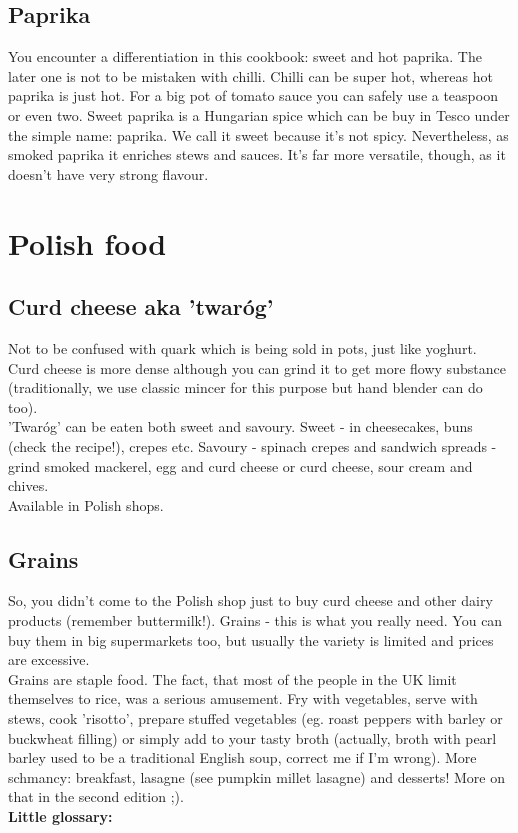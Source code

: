 \documentclass[12pt,a4paper]{article}
\begin{document}
		\subsection* {Paprika}
	You encounter a differentiation in this cookbook: sweet and hot paprika. The later one is not to be mistaken with chilli. Chilli can be super hot, whereas hot paprika is just hot. For a big pot of tomato sauce you can safely use a teaspoon or even two. Sweet paprika is a Hungarian spice which can be buy in Tesco under the simple name: paprika. We call it sweet because it's not spicy. Nevertheless, as smoked paprika it enriches stews and sauces. It's far more versatile, though, as it doesn't have very strong flavour.
	
	\section*{Polish food}
	
	\subsection*{Curd cheese aka 'twaróg'}
	
	Not to be confused with quark which is being sold in pots, just like yoghurt.\\
	Curd cheese is more dense although you can grind it to get more flowy substance (traditionally, we use classic mincer for this purpose but hand blender can do too).\\
	'Twaróg' can be eaten both sweet and savoury. Sweet - in cheesecakes, buns (check the recipe!), crepes etc. Savoury - spinach crepes and sandwich spreads - grind smoked mackerel, egg and curd cheese or curd cheese, sour cream and chives.\\
	Available in Polish shops.
	
	\subsection*{Grains}
	So, you didn't come to the Polish shop just to buy curd cheese and other dairy products (remember buttermilk!). Grains - this is what you really need. You can buy them in big supermarkets too, but usually the variety is limited and prices are excessive.\\
	Grains are staple food. The fact, that most of the people in the UK limit themselves to rice, was a serious amusement. Fry with vegetables, serve with stews, cook 'risotto', prepare stuffed vegetables (eg. roast peppers with barley or buckwheat filling) or simply add to your tasty broth (actually, broth with pearl barley used to be a traditional English soup, correct me if I'm wrong). More schmancy: breakfast, lasagne (see pumpkin millet lasagne) and desserts! More on that in the second edition ;).\\
	\textbf{Little glossary:}
	
\end{document}
